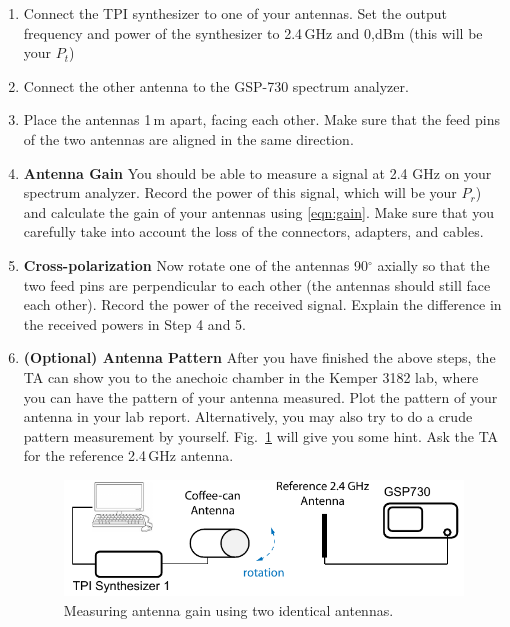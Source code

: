 \documentclass[letterpaper, 11pt]{article}
\begin{document}
\begin{enumerate}
	\item Connect the TPI synthesizer to one of your antennas. Set the output frequency and power of the synthesizer to 2.4\,GHz and 0,dBm (this will be your $P_t$)
		
	\item Connect the other antenna to the GSP-730 spectrum analyzer. 
	
	\item Place the antennas 1\,m apart, facing each other. Make sure that the feed pins of the two antennas are aligned in the same direction. 
	
	\item \textbf{Antenna Gain}	You should be able to measure a signal at 2.4 GHz on your spectrum analyzer. Record the power of this signal, which will be your $P_r$) and calculate the gain of your antennas using \eqref{eqn:gain}. Make sure that you carefully take into account the loss of the connectors, adapters, and cables. 
	
	\item \textbf{Cross-polarization} Now rotate one of the antennas 90$^\circ$ axially so that the two feed pins are perpendicular to each other  (the antennas should still face each other). Record the power of the received signal. Explain the difference in the received powers in Step 4 and 5. 
	
	\item \textbf{(Optional) Antenna Pattern } After you have finished the above steps, the TA can show you to the anechoic chamber in the Kemper 3182 lab, where you can have the pattern of your antenna measured. Plot the pattern of your antenna in your lab report. Alternatively, you may also try to do a crude pattern measurement by yourself. Fig.~\ref{fig:pattern_measure} will give you some hint. Ask the TA for the reference 2.4\,GHz antenna. 
		\begin{figure}[ht]
			\centering	
			\includegraphics[width=4.5in]{pattern_measure}
			\caption{Measuring antenna gain using two identical antennas.}
			\label{fig:pattern_measure}
		\end{figure}
\end{enumerate}
%
% 
%
%
%
\end{document}
